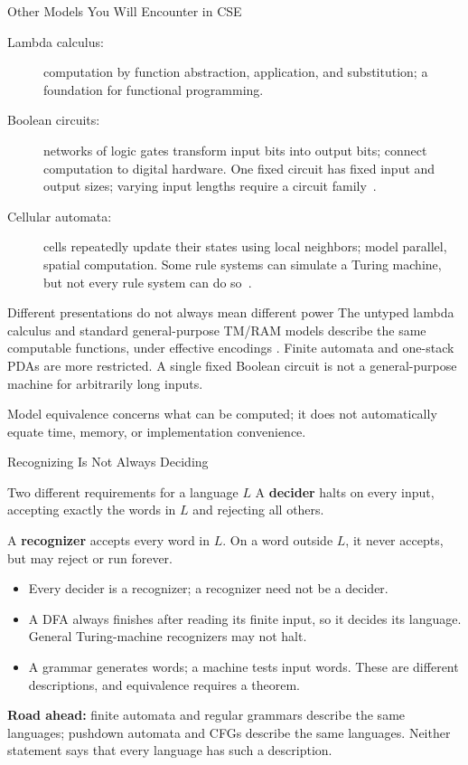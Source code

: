 \documentclass[10pt]{beamer}
\begin{document}
\begin{frame}{Other Models You Will Encounter in CSE}
  \small
  \begin{description}
    \item[Lambda calculus:] computation by function abstraction, application,
      and substitution; a foundation for functional programming.
    \pause
    \item[Boolean circuits:] networks of logic gates transform input bits
      into output bits; connect computation to digital hardware.
      One fixed circuit has fixed input and output sizes; varying input
      lengths require a circuit family~\cite{circuit-model}.
    \pause
    \item[Cellular automata:] cells repeatedly update their states using
      local neighbors; model parallel, spatial computation. Some rule
      systems can simulate a Turing machine, but not every rule system can
      do so~\cite{other-models}.
  \end{description}
  \pause
  \begin{block}{Different presentations do not always mean different power}
    The untyped lambda calculus and standard general-purpose TM/RAM models
    describe the same computable functions, under effective encodings
    \cite{other-models}. Finite automata and one-stack PDAs are more restricted.
    A single fixed Boolean circuit is not a general-purpose machine for
    arbitrarily long inputs.
  \end{block}
  Model equivalence concerns what can be computed; it does not automatically
  equate time, memory, or implementation convenience.
\end{frame}

\begin{frame}{Recognizing Is Not Always Deciding}
  \small
  \begin{block}{Two different requirements for a language $L$}
    A \textbf{decider} halts on every input, accepting exactly the words
    in $L$ and rejecting all others.
    \par\smallskip
    A \textbf{recognizer} accepts every word in $L$. On a word outside $L$,
    it never accepts, but may reject or run forever.
  \end{block}
  \pause
  \begin{itemize}
    \item Every decider is a recognizer; a recognizer need not be a decider.
    \item A DFA always finishes after reading its finite input, so it decides
      its language. General Turing-machine recognizers may not halt.
    \item A grammar generates words; a machine tests input words. These
      are different descriptions, and equivalence requires a theorem.
  \end{itemize}
  \pause
  \textbf{Road ahead:} finite automata and regular grammars describe the
  same languages; pushdown automata and CFGs describe the same languages.
  Neither statement says that every language has such a description.
\end{frame}
\end{document}
